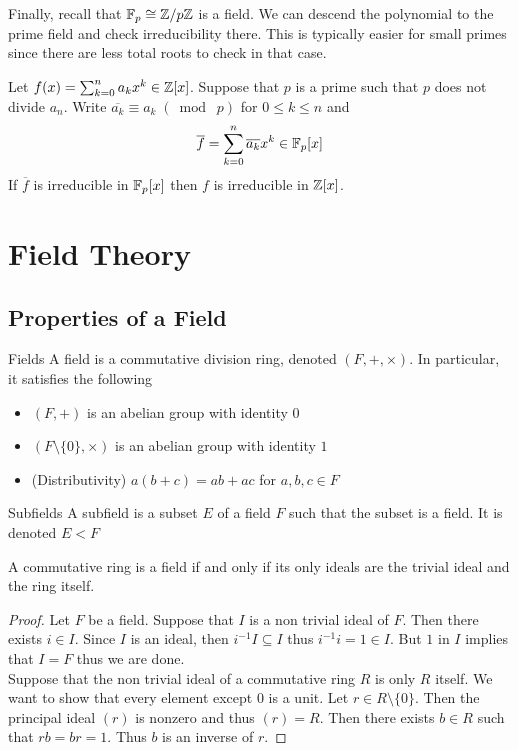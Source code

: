 \documentclass[a4paper]{article}
\begin{document}
Finally, recall that $\mathbb{F}_p\cong\mathbb{Z}/p\mathbb{Z}$ is a field. We can descend the polynomial to the prime field and check irreducibility there. This is typically easier for small primes since there are less total roots to check in that case. 

\begin{thm}{}{} Let $f(x)=\sum_{k=0}^na_kx^k\in\mathbb{Z}[x]$. Suppose that $p$ is a prime such that $p$ does not divide $a_n$. Write $\overline{a_k}\equiv a_k\;(\bmod\;p)$ for $0\leq k\leq n$ and $$\overline{f}=\sum_{k=0}^n\overline{a_k}x^k\in\mathbb{F}_p[x]$$ If $\overline{f}$ is irreducible in $\mathbb{F}_p[x]$ then $f$ is irreducible in $\mathbb{Z}[x]$. 
\end{thm}


\pagebreak
\section{Field Theory}
\subsection{Properties of a Field}
\begin{defn}{Fields}{} A field is a commutative division ring, denoted $(F,+,\times)$. In particular, it satisfies the following
\begin{itemize}
\item $(F,+)$ is an abelian group with identity $0$
\item $(F\setminus\{0\},\times)$ is an abelian group with identity $1$
\item (Distributivity) $a(b+c)=ab+ac$ for $a,b,c\in F$
\end{itemize}
\end{defn}

\begin{defn}{Subfields}{} A subfield is a subset $E$ of a field $F$ such that the subset is a field. It is denoted $E<F$
\end{defn}

\begin{prp}{}{} A commutative ring is a field if and only if its only ideals are the trivial ideal and the ring itself. 
\begin{proof}
Let $F$ be a field. Suppose that $I$ is a non trivial ideal of $F$. Then there exists $i\in I$. Since $I$ is an ideal, then $i^{-1}I\subseteq I$ thus $i^{-1}i=1\in I$. But $1$ in $I$ implies that $I=F$ thus we are done. \\
Suppose that the non trivial ideal of a commutative ring $R$ is only $R$ itself. We want to show that every element except $0$ is a unit. Let $r\in R\setminus\{0\}$. Then the principal ideal $(r)$ is nonzero and thus $(r)=R$. Then there exists $b\in R$ such that $rb=br=1$. Thus $b$ is an inverse of $r$. 
\end{proof}
\end{prp}
\end{document}
